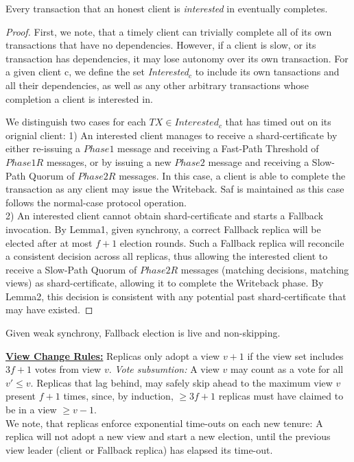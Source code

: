 \begin{theorem}[Liv] 
Every transaction that an honest client is \textit{interested} in eventually completes.
\end{theorem}

\begin{proof}
First, we note, that a timely client can trivially complete all of its own transactions that have no dependencies. However, if a client is slow, or its transaction has dependencies, it may lose autonomy over its own transaction. For a given client c, we define the set \textit{Interested$_c$} to include its own tansactions and all their dependencies, as well as any other arbitrary transactions whose completion a client is interested in. 

We distinguish two cases for each $TX \in Interested_c$ that has timed out on its orignial client: 
1) An interested client manages to receive a shard-certificate by either re-issuing a $Phase1$ message and receiving a Fast-Path Threshold of $Phase1R$ messages, or by issuing a new $Phase2$ message and receiving a Slow-Path Quorum of $Phase2R$ messages. In this case, a client is able to complete the transaction as any client may issue the Writeback. Saf is maintained as this case follows the normal-case protocol operation.\\

2) An interested client cannot obtain shard-certificate and starts a Fallback invocation. By Lemma1, given synchrony, a correct Fallback replica will be elected after at most $f+1$ election rounds. Such a Fallback replica will reconcile a consistent decision across all replicas, thus allowing the interested client to receive a Slow-Path Quorum of $Phase2R$ messages (matching decisions, matching views) as shard-certificate, allowing it to complete the Writeback phase. By Lemma2, this decision is consistent with any potential past shard-certificate that may have existed.

\end{proof}



\begin{lemma}
Given weak synchrony, Fallback election is live and non-skipping.
\end{lemma}

\underline{\textbf{View Change Rules:}} \one Replicas only adopt a view $v+1$ if the view set includes $3f+1$ votes from view $v$. \textit{Vote subsumtion:} A view $v$ may count as a vote for all $v' \leq v$. \two Replicas that lag behind, may safely skip ahead to the maximum view $v$ present $f+1$ times, since, by induction, $\geq 3f+1$ replicas must have claimed to be in a view $\geq v-1$. \\
We note, that replicas enforce exponential time-outs on each new tenure: A replica will not adopt a new view and start a new election, until the previous view leader (client or Fallback replica) has elapsed its time-out.

